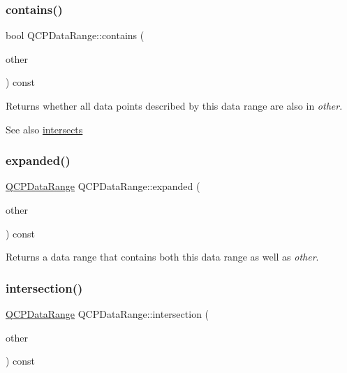 \subsubsection{\texorpdfstring{contains()}{contains()}}
{\footnotesize\ttfamily bool Q\+C\+P\+Data\+Range\+::contains (\begin{DoxyParamCaption}\item[{const \hyperlink{class_q_c_p_data_range}{Q\+C\+P\+Data\+Range} \&}]{other }\end{DoxyParamCaption}) const}

Returns whether all data points described by this data range are also in {\itshape other}.

\begin{DoxySeeAlso}{See also}
\hyperlink{class_q_c_p_data_range_a8a1c437f9beffd55621f48f961d7f679}{intersects} 
\end{DoxySeeAlso}
\mbox{\label{class_q_c_p_data_range_a36c8ad8acf177ffeb0a72c8d73030844}} 
\subsubsection{\texorpdfstring{expanded()}{expanded()}}
{\footnotesize\ttfamily \hyperlink{class_q_c_p_data_range}{Q\+C\+P\+Data\+Range} Q\+C\+P\+Data\+Range\+::expanded (\begin{DoxyParamCaption}\item[{const \hyperlink{class_q_c_p_data_range}{Q\+C\+P\+Data\+Range} \&}]{other }\end{DoxyParamCaption}) const}

Returns a data range that contains both this data range as well as {\itshape other}. \mbox{\label{class_q_c_p_data_range_a84e1e03129dd52528efb4bac18d30183}} 
\subsubsection{\texorpdfstring{intersection()}{intersection()}}
{\footnotesize\ttfamily \hyperlink{class_q_c_p_data_range}{Q\+C\+P\+Data\+Range} Q\+C\+P\+Data\+Range\+::intersection (\begin{DoxyParamCaption}\item[{const \hyperlink{class_q_c_p_data_range}{Q\+C\+P\+Data\+Range} \&}]{other }\end{DoxyParamCaption}) const}

